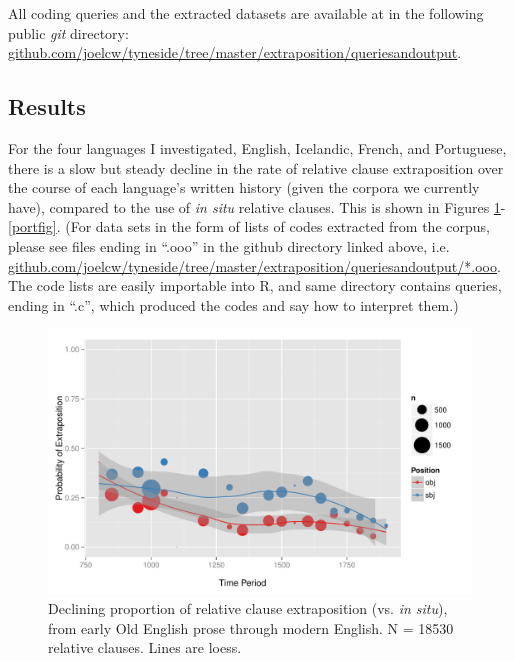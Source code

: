 
All coding queries and the extracted datasets are available at in the following public \textsl{git} directory: \url{github.com/joelcw/tyneside/tree/master/extraposition/queriesandoutput}.






\subsection{Results}
\label{results}

For the four languages I investigated, English, Icelandic, French, and Portuguese, there is a slow but steady decline in the rate of relative clause extraposition over the course of each language's written history (given the corpora we currently have), compared to the use of \textsl{in situ} relative clauses. This is shown in Figures \ref{engfig}-\ref{portfig}. (For data sets in the form of lists of codes extracted from the corpus, please see files ending in ``.ooo'' in the github directory linked above, i.e. \url{github.com/joelcw/tyneside/tree/master/extraposition/queriesandoutput/*.ooo}. The code lists are easily importable into R, and same directory contains queries, ending in ``.c'', which produced the codes and say how to interpret them.)


\begin{figure}

  \includegraphics[width=1.1\textwidth]{stableVarTalks/exSbjObjYearBinned50Loessymeb.pdf}
\caption{Declining proportion of relative clause extraposition (vs. \textsl{in situ}), from early Old English prose through modern English. N = 18530 relative clauses. Lines are loess.}
\label{engfig}       %
\end{figure}


